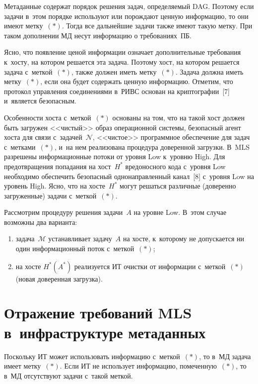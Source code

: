 \begin{multicols}{2}
  \smallskip
  
  Метаданные содержат порядок решения задач, определяемый DAG. Поэтому 
если задачи в~этом порядке используют или порождают ценную информацию, то 
они имеют метку~$(*)$. Тогда все дальнейшие задачи также имеют такую метку. 
При таком дополнении МД несут информацию о требованиях~ПБ. 
  
  Ясно, что появление ценой информации означает дополнительные требования 
  к~хосту, на котором решается эта задача. Поэтому хост, на котором решается задача 
с~меткой~$(*)$, также должен иметь метку~$(*)$. Задача должна иметь 
метку~$(*)$, если она будет содержать ценную информацию. Отметим, что 
протокол управления соединениями в~РИВС основан на криптографии~[7] 
и~является безопасным. 
  
  Особенности хоста с~меткой~$(*)$ основаны на том, что на такой хост должен 
быть загружен <<чис\-тый>> образ операционной сис\-те\-мы, безопасный агент хоста для связи 
с~задачей~$\mathcal{N}$, <<чис\-тое>> программное
обеспечение для задач с~метками~$(*)$, и~на нем 
реализована процедура доверенной загрузки. В~MLS разрешены информационные 
потоки от уровня Low к~уровню High. Для предотвращения попадания на 
хост~$H^*$ вредоносного кода с~уровня Low необходимо обеспечить безопасный 
однонаправленный канал~[8] с~уровня Low на уровень High. Ясно, что на 
хосте~$H^*$ могут решаться различные (доверенно загруженные) задачи 
с~меткой~$(*)$. 
  
  Рассмотрим процедуру решения задачи~$A$ на уровне Low. В~этом случае 
возможны два варианта:
  \begin{enumerate}[(1)]
\item задача~$\mathcal{M}$ устанавливает задачу~$A$ на хосте, к~которому не 
допускается ни один информационный поток с~меткой~$(*)$;
\item на хосте $H^*(A^*)$ реализуется ИТ очистки от информации 
с~меткой~$(*)$ (новая доверенная загрузка). 
\end{enumerate}
  
\section{Отражение требований MLS в~инфраструктуре метаданных}

  Поскольку ИТ может использовать информацию с~меткой~$(*)$, то в~МД задача 
имеет метку~$(*)$. Если ИТ не использует информацию, помеченную~$(*)$, то 
в~МД отсутствуют задачи с~такой меткой. 
  

\end{multicols}
